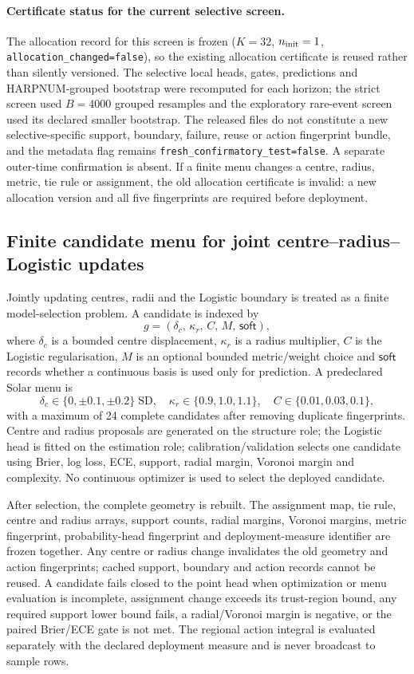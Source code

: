 \documentclass[11pt,a4paper]{article}
\numberwithin{equation}{section}
\theoremstyle{definition}\newtheorem{definition}[theorem]{Definition}
\theoremstyle{remark}\newtheorem{remark}[theorem]{Remark}
\begin{document}
\paragraph{Certificate status for the current selective screen.}
The allocation record for this screen is frozen ($K=32$, $n_{\rm init}=1$, \texttt{allocation\_changed=false}), so the existing allocation certificate is reused rather than silently versioned. The selective local heads, gates, predictions and HARPNUM-grouped bootstrap were recomputed for each horizon; the strict screen used $B=4000$ grouped resamples and the exploratory rare-event screen used its declared smaller bootstrap. The released files do not constitute a new selective-specific support, boundary, failure, reuse or action fingerprint bundle, and the metadata flag remains \texttt{fresh\_confirmatory\_test=false}. A separate outer-time confirmation is absent. If a finite menu changes a centre, radius, metric, tie rule or assignment, the old allocation certificate is invalid: a new allocation version and all five fingerprints are required before deployment.

\subsection{Finite candidate menu for joint centre--radius--Logistic updates}
\label{sec:finite_joint_geometry_menu}
Jointly updating centres, radii and the Logistic boundary is treated as a finite model-selection problem. A candidate is indexed by
\[
 g=(\delta_c,\,\kappa_r,\,C,\,M,\,\mathsf{soft}),
\]
where $\delta_c$ is a bounded centre displacement, $\kappa_r$ is a radius multiplier, $C$ is the Logistic regularisation, $M$ is an optional bounded metric/weight choice and $\mathsf{soft}$ records whether a continuous basis is used only for prediction. A predeclared Solar menu is
\[
 \delta_c\in\{0,\pm0.1,\pm0.2\}\;\mathrm{SD},\quad
 \kappa_r\in\{0.9,1.0,1.1\},\quad
 C\in\{0.01,0.03,0.1\},
\]
with a maximum of 24 complete candidates after removing duplicate fingerprints. Centre and radius proposals are generated on the structure role; the Logistic head is fitted on the estimation role; calibration/validation selects one candidate using Brier, log loss, ECE, support, radial margin, Voronoi margin and complexity. No continuous optimizer is used to select the deployed candidate.

After selection, the complete geometry is rebuilt. The assignment map, tie rule, centre and radius arrays, support counts, radial margins, Voronoi margins, metric fingerprint, probability-head fingerprint and deployment-measure identifier are frozen together. Any centre or radius change invalidates the old geometry and action fingerprints; cached support, boundary and action records cannot be reused. A candidate fails closed to the point head when optimization or menu evaluation is incomplete, assignment change exceeds its trust-region bound, any required support lower bound fails, a radial/Voronoi margin is negative, or the paired Brier/ECE gate is not met. The regional action integral is evaluated separately with the declared deployment measure and is never broadcast to sample rows.
\end{document}

